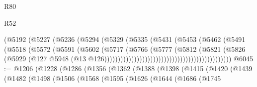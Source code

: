 \begin{lexlean}{R80}
\begin{lexlean}{R52}
\begin{coremodule}
{{{{{{{{{{{{{{{{{{{{{{{{{{{{{{{{{{{{{{{{{{{{{{{{{{{{{{{{{{{{{{{{{{{{{{{{{{{{{{{{{{{{{{{{{{{{{{{{{{{{{{{{{{{{{{{{{{{{{{{{{{{{{{{{{{{{{{{{{{{{{{{{{{{{{{{{{{{{{{{{{{{{{{{{{{{{{{{{{{{{{{{{{{{{{{{{{{{{{{                                                    (@5192
                                                      (@5227
                                                        (@5236
                                                          (@5294
                                                            (@5329
                                                              (@5335
                                                                (@5431
                                                                  (@5453
                                                                    (@5462
                                                                      (@5491
                                                                        (@5518
                                                                          (@5572
                                                                            (@5591
                                                                              (@5602
                                                                                (@5717
                                                                                  (@5766
                                                                                    (@5777
                                                                                      (@5812
                                                                                        (@5821
                                                                                          (@5826
                                                                                            (@5929
                                                                                              (@127
                                                                                                @5948
                                                                                                (@13
                                                                                                  @126)))))))))))))))))))))))))))))))))))))))))))))))
@6045 := @1206
    (@1228
      (@1286
        (@1356
          (@1362
            (@1388
              (@1398
                (@1415
                  (@1420
                    (@1439
                      (@1482
                        (@1498
                          (@1506
                            (@1568
                              (@1595
                                (@1626
                                  (@1644
                                    (@1686
                                      (@1745
}}}}}}}}}}}}}}}}}}}}}}}}}}}}}}}}}}}}}}}}}}}}}}}}}}}}}}}}}}}}}}}}}}}}}}}}}}}}}}}}}}}}}}}}}}}}}}}}}}}}}}}}}}}}}}}}}}}}}}}}}}}}}}}}}}}}}}}}}}}}}}}}}}}}}}}}}}}}}}}}}}}}}}}}}}}}}}}}}}}}}}}}}}}}}}}}}}}}}}
\end{coremodule}
\end{lexlean}
\end{lexlean}
